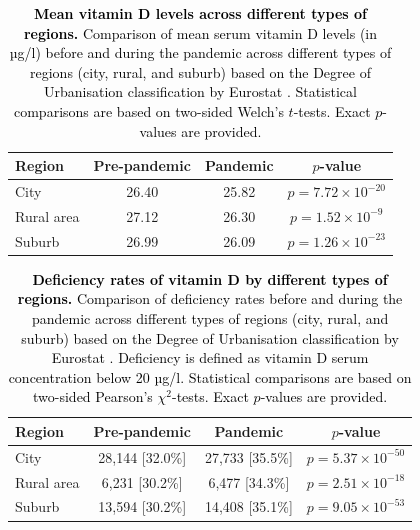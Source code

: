 \documentclass[12pt]{article}
\newcommand{\REV}[1]{\textcolor{black}{#1}}
\begin{document}
\begin{appendices}
\begin{table}[h]
\centering
{}
\caption[Mean vitamin D levels across different types of regions]{\REV{\textbf{Mean vitamin D levels across different types of regions.} Comparison of mean serum vitamin D levels (in µg/l) before and during the pandemic across different types of regions (city, rural, and suburb) based on the Degree of Urbanisation classification by Eurostat \cite{eurostat_degurb_gisco}.  Statistical comparisons are based on two-sided Welch's $t$-tests. Exact $p$-values are provided.}}
\label{tab:results_stat_level_region}
\begin{tabular}{|l|c|c|c|}
\hline
\rowcolor{orange!20} \textbf{Region} & \textbf{Pre-pandemic} & \textbf{Pandemic} & \textbf{$p$-value} \\
\hline
City & 26.40& 25.82& $p = 7.72 \times 10^{-20}$\\
Rural area & 27.12& 26.30& $p = 1.52 \times 10^{-9}$\\
Suburb & 26.99& 26.09& $p = 1.26 \times 10^{-23}$\\
\hline
\end{tabular}
\end{table}

\newpage

\begin{table}[h]
\centering
{}
\caption[Deficiency rates of vitamin D by different types of regions]{\REV{\textbf{Deficiency rates of vitamin D by different types of regions.} Comparison of deficiency rates before and during the pandemic across different types of regions (city, rural, and suburb) based on the Degree of Urbanisation classification by Eurostat \cite{eurostat_degurb_gisco}. Deficiency is defined as vitamin D serum concentration below 20 µg/l. Statistical comparisons are based on two-sided Pearson's $\chi^2$-tests. Exact $p$-values are provided.}}
\label{tab:results_stat_deficiency_rate_region}
\begin{tabular}{|l|c|c|c|}
\hline
\rowcolor{orange!20} \textbf{Region} & \textbf{Pre-pandemic} & \textbf{Pandemic} & \textbf{$p$-value} \\
\hline
City & 28,144 [32.0\%] & 27,733 [35.5\%] & $p = 5.37 \times 10^{-50}$\\
Rural area & 6,231 [30.2\%] & 6,477 [34.3\%] & $p = 2.51 \times 10^{-18}$\\
Suburb & 13,594 [30.2\%] & 14,408 [35.1\%] & $p = 9.05 \times 10^{-53}$\\
\hline
\end{tabular}
\end{table}


\end{appendices}
\end{document}
